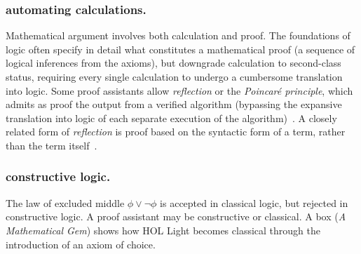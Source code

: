 \documentclass{llncs}
\begin{document}
\subsubsection{automating calculations.} Mathematical argument
involves both calculation and proof.  The foundations of logic often
specify in detail what constitutes a mathematical proof (a sequence of
logical inferences from the axioms), but downgrade calculation to
second-class status, requiring every single calculation to undergo a
cumbersome translation into logic.  
Some proof assistants allow {\it reflection} or the {\it Poincar\'e principle}, which admits as proof
the output from a verified algorithm (bypassing the expansive
translation into logic of each separate execution of the algorithm)~\cite[p.~4]{HPSH}.
A closely related form
of {\it reflection} is proof based on the syntactic form of a term,
rather than the term itself~\cite{BFM}.



\subsubsection{constructive logic.} The
law of excluded middle $\phi\lor\lnot \phi$ is accepted in classical
logic, but rejected in constructive logic.  A proof assistant
may be constructive or classical.  A box ({\it A Mathematical Gem}) shows how HOL Light becomes
classical through the introduction of an axiom of choice.

\newpage
\bigskip
\noindent
\end{document}
